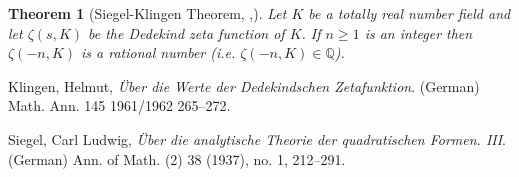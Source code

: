 \documentclass[12pt]{article}
\newtheorem*{thm}{Theorem}
\theoremstyle{definition}
\newcommand{\Rats}{\mathbb{Q}}
\begin{document}
\begin{thm}[Siegel-Klingen Theorem, \cite{klingen},\cite{siegel}]
Let $K$ be a totally real number field and let $\zeta(s,K)$ be the Dedekind zeta function of $K$. If $n\geq 1$ is an integer then $\zeta(-n,K)$ is a rational number (i.e. $\zeta(-n,K)\in \Rats$).
\end{thm}

\begin{thebibliography}{99}
  Klingen, Helmut, {\em \"Uber die Werte der Dedekindschen Zetafunktion}. (German)  Math. Ann.  145  1961/1962 265--272.

 Siegel, Carl Ludwig, {\em  \"Uber die analytische Theorie der quadratischen Formen. III}. (German)  Ann. of Math. (2)  38  (1937),  no. 1, 212--291.
\end{thebibliography}
\end{document}
